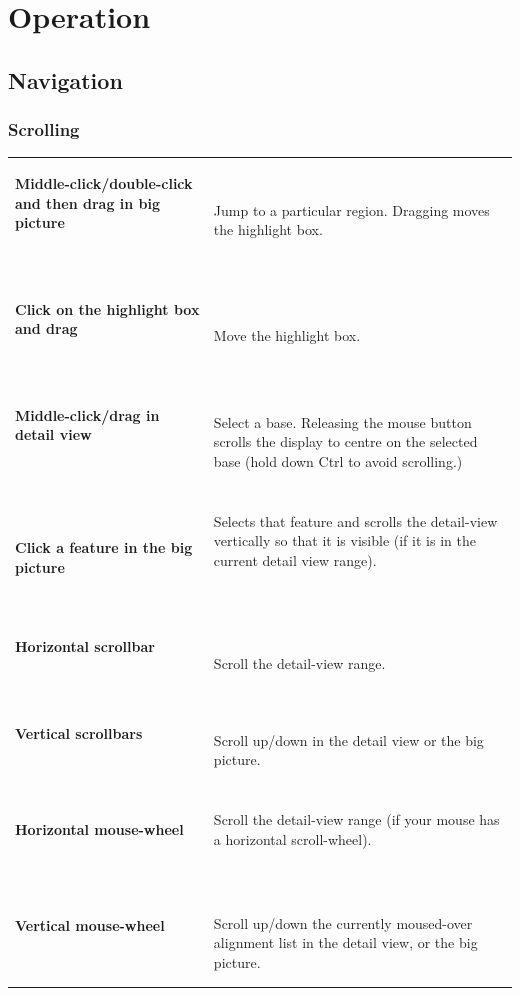 \documentclass[letterpaper]{article}
\begin{document}
{\color[rgb]{0.0,0.27058825,0.5254902}\section[Operation]{Operation}}
{\color[rgb]{0.30980393,0.5058824,0.7411765}\hypertarget{RefHeading1821056909880}{}\subsection[Navigation]{Navigation}}
{\color[rgb]{0.30980393,0.5058824,0.7411765}\hypertarget{RefHeading1841056909880}{}\subsubsection[Scrolling]{Scrolling}}
\hypertarget{RefHeading1861056909880}{}\begin{flushleft}
\tablehead{}
\begin{supertabular}{p{4.15cm}p{10.436cm}}
{\bfseries Middle-click/double-click and then
drag in big picture}

~
 &
 Jump to a particular region. Dragging moves the highlight box.\\
{\bfseries Click on the highlight box and drag}

~
 &
 Move the highlight box.\\
{\bfseries Middle-click/drag in detail view}

~
 &
 Select a base. Releasing the mouse button scrolls the display to centre on the selected base (hold down Ctrl to avoid scrolling.)\\
\bfseries Click a feature in the big picture &
{ Selects that feature and scrolls the
detail-view vertically so that it is visible (if it is in the current
detail view range).}

~
\\
{\bfseries Horizontal scrollbar}

~
 &
 Scroll the detail-view range.\\
{\bfseries Vertical scrollbars}

~
 &
 Scroll up/down in the detail view or the big
picture.\\
{\bfseries Horizontal mouse-wheel}

~
 &
{ Scroll the detail-view range (if your mouse
has a horizontal scroll-wheel).}

~
\\
{\bfseries Vertical mouse-wheel}

~
 &
{ Scroll up/down the currently moused-over
alignment list in the detail view, or the big picture.}


\end{supertabular}
\end{flushleft}
\end{document}
